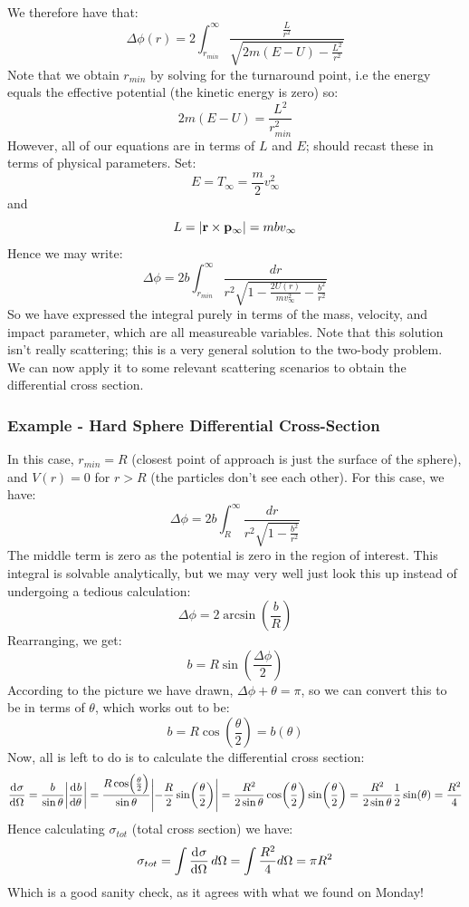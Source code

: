 We therefore have that:
\[\Delta \phi(r) = 2\int_{r_{min}}^\infty \frac{\frac{L}{r^2}}{\sqrt{2m(E-U) - \frac{L^2}{r^2}}}\]
Note that we obtain $r_{min}$ by solving for the turnaround point, i.e the energy equals the effective potential (the kinetic energy is zero) so:
\[2m(E - U) = \frac{L^2}{r_{min}^2}\]
However, all of our equations are in terms of $L$ and $E$;  should recast these in terms of physical parameters. Set:
\[E = T_{\infty} = \frac{m}{2}v_{\infty}^2\]
and 
\[L = \abs{\mathbf{r} \times \mathbf{p}_{\infty}} = mbv_{\infty}\]
Hence we may write:
\[\Delta \phi = 2b\int_{r_{min}}^\infty \frac{dr}{r^2\sqrt{1 - \frac{2U(r)}{mv_{\infty}^2} - \frac{b^2}{r^2}}}\]
So we have expressed the integral purely in terms of the mass, velocity, and impact parameter, which are all measureable variables. Note that this solution isn't really scattering; this is a very general solution to the two-body problem. 
We can now apply it to some relevant scattering scenarios to obtain the differential cross section.

\subsubsection{Example - Hard Sphere Differential Cross-Section}
In this case, $r_{min} = R$ (closest point of approach is just the surface of the sphere), and $V(r) = 0$ for $r > R$ (the particles don't see each other). For this case, we have:
\[\Delta \phi = 2b\int_R^\infty\frac{dr}{r^2\sqrt{1 - \frac{b^2}{r^2}}}\]
The middle term is zero as the potential is zero in the region of interest. This integral is solvable analytically, but we may very well just look this up instead of undergoing a tedious calculation:
\[\Delta \phi = 2\arcsin(\frac{b}{R})\]
Rearranging, we get:
\[b = R\sin(\frac{\Delta \phi}{2})\]
According to the picture we have drawn, $\Delta \phi + \theta = \pi$, so we can convert this to be in terms of $\theta$, which works out to be:
\[b = R\cos(\frac{\theta}{2}) = b(\theta)\]
Now, all is left to do is to calculate the differential cross section:
\[\dod{\sigma}{\Omega} = \frac{b}{\sin\theta}\abs{\dod{b}{\theta}} = \frac{R\cos(\frac{\theta}{2})}{\sin\theta}\abs{-\frac{R}{2}\sin(\frac{\theta}{2})} = \frac{R^2}{2\sin\theta}\cos(\frac{\theta}{2})\sin(\frac{\theta}{2}) = \frac{R^2}{2\sin\theta}\frac{1}{2}\sin(\theta) = \frac{R^2}{4}\]
Hence calculating $\sigma_{tot}$ (total cross section) we have:
\[\sigma_{tot} = \int \dod{\sigma}{\Omega}d\Omega = \int \frac{R^2}{4}d\Omega = \pi R^2\]
Which is a good sanity check, as it agrees with what we found on Monday!

